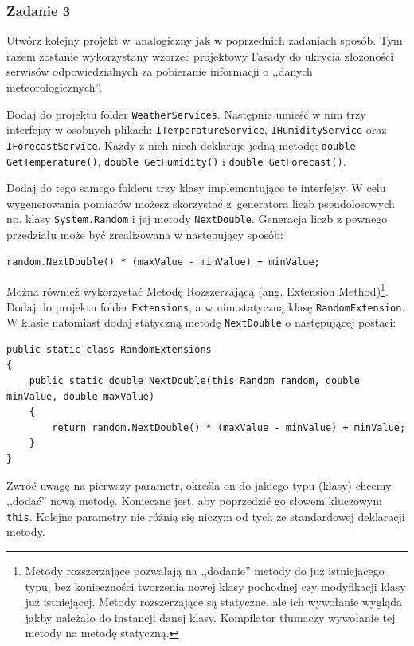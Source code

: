 \subsubsection{Zadanie 3}

Utwórz kolejny projekt w~analogiczny jak w poprzednich zadaniach sposób. Tym razem zostanie wykorzystany wzorzec projektowy Fasady do ukrycia złożoności serwisów odpowiedzialnych za pobieranie informacji o ,,danych meteorologicznych''.

Dodaj do projektu folder \texttt{WeatherServices}. Następnie umieść w nim trzy interfejsy w osobnych plikach: \texttt{ITemperatureService}, \texttt{IHumidityService} oraz \texttt{IForecastService}. Każdy z nich niech deklaruje jedną metodę: \texttt{double GetTemperature()}, \texttt{double GetHumidity()} i \texttt{double GetForecast()}. 

Dodaj do tego samego folderu trzy klasy implementujące te interfejsy. W celu wygenerowania pomiarów możesz skorzystać z~generatora liczb pseudolosowych np. klasy \texttt{System.Random} i jej metody \texttt{NextDouble}. Generacja liczb z pewnego przedziału może być zrealizowana w następujący sposób:
\begin{lstlisting}	
random.NextDouble() * (maxValue - minValue) + minValue;
\end{lstlisting}
Można również wykorzystać Metodę Rozszerzającą (ang. Extension Method)\footnote{Metody rozszerzające pozwalają na ,,dodanie'' metody do już istniejącego typu, bez konieczności tworzenia nowej klasy pochodnej czy modyfikacji klasy już istniejącej. Metody rozszerzające są statyczne, ale ich wywołanie wygląda jakby należało do instancji danej klasy. Kompilator tłumaczy wywołanie tej metody na metodę statyczną. 
}. Dodaj do projektu folder \texttt{Extensions}, a w nim statyczną klasę \texttt{RandomExtension}. W  klasie natomiast dodaj statyczną metodę \texttt{NextDouble} o następującej postaci:
\begin{lstlisting}	
public static class RandomExtensions
{
	public static double NextDouble(this Random random, double minValue, double maxValue)
	{
		return random.NextDouble() * (maxValue - minValue) + minValue;
	}
}
\end{lstlisting}
Zwróć uwagę na pierwszy parametr, określa on do jakiego typu (klasy) chcemy ,,dodać'' nową metodę. Konieczne jest, aby poprzedzić go słowem kluczowym \texttt{this}. Kolejne parametry nie różnią się niczym od tych ze standardowej deklaracji metody.


